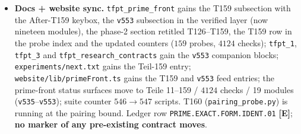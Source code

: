 \documentclass[11pt]{article}
\providecommand{\mE}{\textbf{[E]}}\providecommand{\mC}{\textbf{[C]}}
\begin{document}
\begin{itemize}[leftmargin=1.5em]
above $t=0.25$ --- but the atom block obeys no sign law, and the full-block criterion is
vacuous. Balance $6/3/4/1\to13$ theorem / $6$ cert-unif / $4$ cert-window / $1$ measured;
a numerical horizon declared as its own measurement ($\mathrm{cond}(B_{LL})>10^{12}$ from
$h=1292$); one fully explicit pairing inequality remains, under attack via correlation
structure in T160 (\texttt{pairing\_probe.py}), running. NOT RH evidence; no marker moves.
\item \textbf{Docs + website sync.} \texttt{tfpt\_prime\_front} gains the T159 subsection
with the After-T159 keybox, the \texttt{v553} subsection in the verified layer (now
nineteen modules), the phase-2 section retitled T126--T159, the T159 row in the probe
index and the updated counters ($159$ probes, $4124$ checks); \texttt{tfpt\_1},
\texttt{tfpt\_3} and \texttt{tfpt\_research\_contracts} gain the \texttt{v553} companion
blocks; \texttt{experiments/next.txt} gains the Teil-159 entry;
\texttt{website/lib/primeFront.ts} gains the T159 and \texttt{v553} feed entries; the
prime-front status surfaces move to Teile 11--159 / $4124$ checks / 19 modules
(\texttt{v535}--\texttt{v553}); suite counter $546\to547$ scripts. T160
(\texttt{pairing\_probe.py}) is running at the pairing bound. Ledger row
\texttt{PRIME.EXACT.FORM.IDENT.01} \mE; \textbf{no marker of any pre-existing contract
moves}.
\end{itemize}
\end{document}
